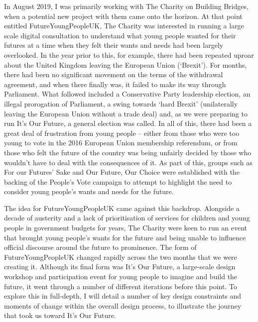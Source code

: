 In August 2019, I was primarily working with The Charity on Building Bridges, when a potential new project with them came onto the horizon. At that point entitled FutureYoungPeopleUK, The Charity was interested in running a large scale digital consultation to understand what young people wanted for their futures at a time when they felt their wants and needs had been largely overlooked. In the year prior to this, for example, there had been repeated uproar about the United Kingdom leaving the European Union (‘Brexit’). For months, there had been no significant movement on the terms of the withdrawal agreement, and when there finally was, it failed to make its way through Parliament. What followed included a Conservative Party leadership election, an illegal prorogation of Parliament, a swing towards ‘hard Brexit’ (unilaterally leaving the European Union without a trade deal) and, as we were preparing to run It’s Our Future, a general election was called. In all of this, there had been a great deal of frustration from young people – either from those who were too young to vote in the 2016 European Union membership referendum, or from those who felt the future of the country was being unfairly decided by those who wouldn’t have to deal with the consequences of it. As part of this, groups such as For our Futures’ Sake and Our Future, Our Choice were established with the backing of the People’s Vote campaign to attempt to highlight the need to consider young people’s wants and needs for the future.

The idea for FutureYoungPeopleUK came against this backdrop. Alongside a decade of austerity and a lack of prioritisation of services for children and young people in government budgets for years, The Charity were keen to run an event that brought young people’s wants for the future and being unable to influence official discourse around the future to prominence. The form of FutureYoungPeopleUK changed rapidly across the two months that we were creating it. Although its final form was It’s Our Future, a large-scale design workshop and participation event for young people to imagine and build the future, it went through a number of different iterations before this point. To explore this in full-depth, I will detail a number of key design constraints and moments of change within the overall design process, to illustrate the journey that took us toward It’s Our Future.

